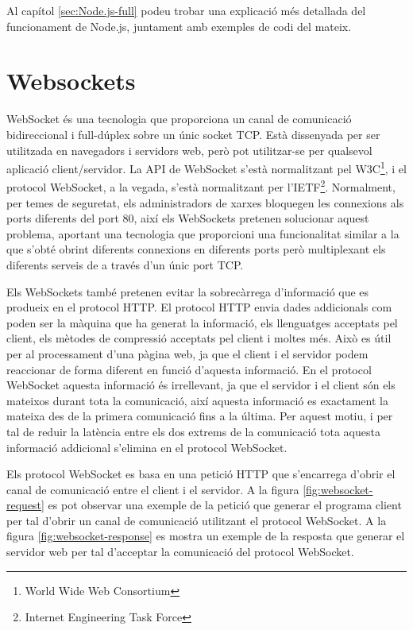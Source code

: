 Al capítol \ref{sec:Node.js-full} podeu trobar una explicació més detallada del funcionament de Node.js, juntament amb exemples de codi del mateix.


\section{Websockets}
\label{sec:websockets}

WebSocket és una tecnologia que proporciona un canal de comunicació bidireccional i full-dúplex sobre un únic socket TCP. Està dissenyada per ser utilitzada en navegadors i servidors web, però pot utilitzar-se per qualsevol aplicació client/servidor. La API de WebSocket s'està normalitzant pel W3C\footnote{World Wide Web Consortium}, i el protocol WebSocket, a la vegada, s'està normalitzant per l'IETF\footnote{Internet Engineering Task Force}. Normalment, per temes de seguretat, els administradors de xarxes bloquegen les connexions als ports diferents del port 80, així els WebSockets pretenen solucionar aquest problema, aportant una tecnologia que proporcioni una funcionalitat similar a la que s'obté obrint diferents connexions en diferents ports però multiplexant els diferents serveis de a través d'un únic port TCP.

Els WebSockets també pretenen evitar la sobrecàrrega d'informació que es produeix en el protocol HTTP. El protocol HTTP envia dades addicionals com poden ser la màquina que ha generat la informació, els llenguatges acceptats pel client, els mètodes de compressió acceptats pel client i moltes més. Això es útil per al processament d'una pàgina web, ja que el client i el servidor podem reaccionar de forma diferent en funció d'aquesta informació. En el protocol WebSocket aquesta informació és irrellevant, ja que el servidor i el client són els mateixos durant tota la comunicació, així aquesta informació es exactament la mateixa des de la primera comunicació fins a la última. Per aquest motiu, i per tal de reduir la latència entre els dos extrems de la comunicació tota aquesta informació addicional s'elimina en el protocol WebSocket.

Els protocol WebSocket es basa en una petició HTTP que s'encarrega d'obrir el canal de comunicació entre el client i el servidor. A la figura \ref{fig:websocket-request} es pot observar una exemple de la petició que generar el programa client per tal d'obrir un canal de comunicació utilitzant el protocol WebSocket. A la figura \ref{fig:websocket-response} es mostra un exemple de la resposta que generar el servidor web per tal d'acceptar la comunicació del protocol WebSocket. 

